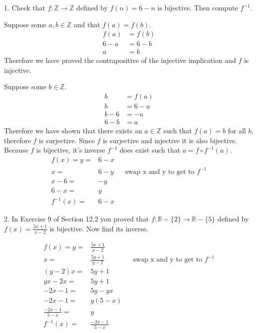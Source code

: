 \documentclass{hippoidC}
\begin{document}
\toc
\thispagestyle{styleTOC}
\pagebreak
\pagestyle{styleE}

\begin{prooflist}{1. Check that $f: \mathbb{Z} \rightarrow \mathbb{Z}$ defined
    by $f(n)=6-n$ is bijective. Then compute $f^{-1}$.}
\inj{}
\item Suppose some $a, b \in \mathbb{Z}$ and that $f(a) = f(b)$.
\begin{align*}
    f(a)&=f(b)\\
    6-a&=6-b\\
    a&=b
\end{align*}
Therefore we have proved the contrapositive of the injective implication and $f$
is injective.
\surj{}
\item Suppose some $b\in \mathbb{Z}$.
\begin{align*}
    b&=f(a)\\
    b&=6-a\\
    b-6&=-a\\
    6-b&=a
\end{align*}
Therefore we have shown that there exists an $a\in\mathbb{Z}$ such that $f(a)=b$
for all $b$, therefore $f$ is surjective. Since $f$ is surjective and injective
it is also bijective. Because $f$ is bijective, it's inverse $f^{-1}$ does exist
such that $a=f\circ f^{-1}(a)$.
\begin{align*}
    f(x)=y=&6-x\\
    x=&6-y&&\text{swap x and y to get to }f^{-1}\\
    x-6=&-y\\
    6-x=&y\\
    f^{-1}(x)=&6-x
\end{align*}
\end{prooflist}

\begin{prooflist}{2. In Exercise 9 of Section 12.2 you proved that $f:
    \mathbb{R}-\{2\} \rightarrow \mathbb{R}-\{5\}$ defined by $f(x)=\frac{5
x+1}{x-2}$ is bijective. Now find its inverse.}
\item
\begin{align*}
    f(x)=y=&\frac{5 x+1}{x-2}\\
    x=&\frac{5y+1}{y-2}&&\text{swap x and y to get to }f^{-1}\\
    (y-2)x=&5y+1\\
    yx-2x=&5y+1\\
    -2x-1=&5y-yx\\
    -2x-1=&y(5-x)\\
    \frac{-2x-1}{5-x}=&y\\
    f^{-1}(x) =& \frac{-2x-1}{5-x}
\end{align*}
\end{prooflist}
\end{document}
